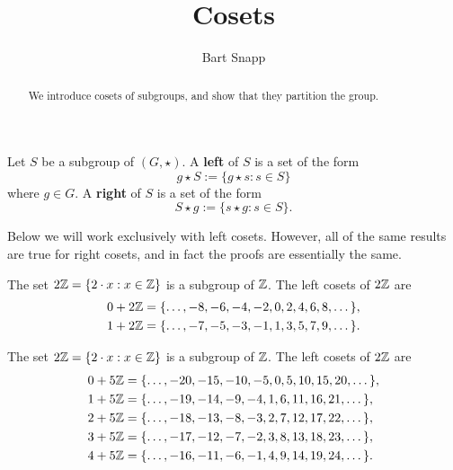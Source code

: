\documentclass{ximera}
\author{Bart Snapp}
\title{Cosets}
\begin{document}
\begin{abstract}
We introduce cosets of subgroups, and show that they partition the
group.
\end{abstract}
\maketitle


\begin{definition}
  Let $S$ be a subgroup of $(G,\star)$. A \textbf{left } of $S$ is a set of
  the form
  \[
  g\star S := \{g\star s : s\in S\}
  \]
  where $g\in G$. A \textbf{right } of $S$ is a set of the form
  \[
  S\star g := \{s\star g : s\in S\}.
  \]
\end{definition}

\begin{remark}
  Below we will work exclusively with left cosets. However, all of the
  same results are true for right cosets, and in fact the proofs are
  essentially the same.
\end{remark}



\begin{example}
  The set $2\mathbb Z = \{2\cdot x: x\in \mathbb Z\}$ is a subgroup of $\mathbb Z$. The
  left cosets of $2\mathbb Z$ are
  \begin{align*}
    0+2\mathbb Z &= \{\dots, -8,-6,-4,-2,0,2,4,6,8,\dots\},\\
    1+2\mathbb Z &= \{\dots, -7,-5,-3,-1,1,3,5,7,9,\dots\}.
  \end{align*}
\end{example}


\begin{example}
  The set $2\mathbb Z = \{2\cdot x: x\in \mathbb Z\}$ is a subgroup of $\mathbb Z$. The
  left cosets of $2\mathbb Z$ are
  \begin{align*}
    0+5\mathbb Z &= \{\dots, -20,-15,-10,-5,0,5,10,15,20,\dots\},\\
    1+5\mathbb Z &= \{\dots, -19,-14,-9 ,-4,1,6,11,16,21,\dots\},\\
    2+5\mathbb Z &= \{\dots, -18,-13,-8 ,-3,2,7,12,17,22,\dots\},\\
    3+5\mathbb Z &= \{\dots, -17,-12,-7 ,-2,3,8,13,18,23,\dots\},\\
    4+5\mathbb Z &= \{\dots, -16,-11,-6 ,-1,4,9,14,19,24,\dots\}.
  \end{align*}
\end{example}
\end{document}
